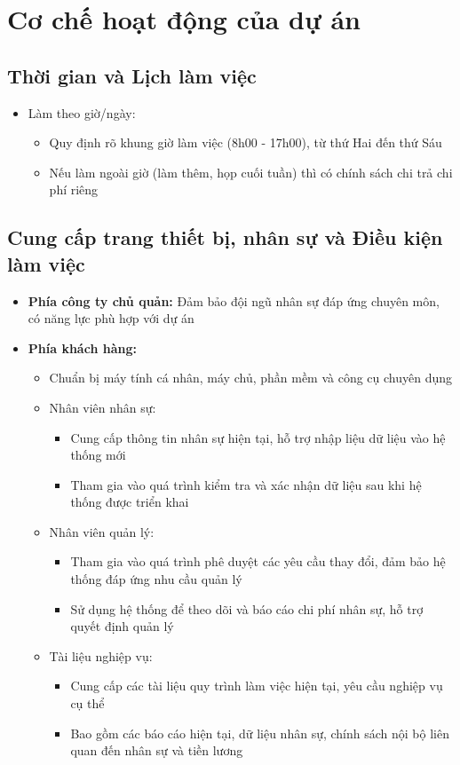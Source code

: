 \section{Cơ chế hoạt động của dự án}
\subsection{Thời gian và Lịch làm việc}
\begin{itemize}
    \item Làm theo giờ/ngày:
    \begin{itemize}
    \item Quy định rõ khung giờ làm việc (8h00 - 17h00), từ thứ Hai đến thứ Sáu
    \item Nếu làm ngoài giờ (làm thêm, họp cuối tuần) thì có chính sách chi trả chi phí riêng
\end{itemize}
\end{itemize}
\subsection{Cung cấp trang thiết bị, nhân sự và Điều kiện làm việc}
\begin{itemize}
    \item \textbf{Phía công ty chủ quản:} Đảm bảo đội ngũ nhân sự đáp ứng chuyên môn, có năng lực phù hợp với dự án
    \item \textbf{Phía khách hàng:}
    \begin{itemize}
    \item Chuẩn bị máy tính cá nhân, máy chủ, phần mềm và công cụ chuyên dụng
    \item Nhân viên nhân sự:
    \begin{itemize}
        \item Cung cấp thông tin nhân sự hiện tại, hỗ trợ nhập liệu dữ liệu vào hệ thống mới
        \item Tham gia vào quá trình kiểm tra và xác nhận dữ liệu sau khi hệ thống được triển khai
    \end{itemize}
    \item Nhân viên quản lý:
    \begin{itemize}
        \item Tham gia vào quá trình phê duyệt các yêu cầu thay đổi, đảm bảo hệ thống đáp ứng nhu cầu quản lý
        \item Sử dụng hệ thống để theo dõi và báo cáo chi phí nhân sự, hỗ trợ quyết định quản lý
    \end{itemize}
    \item Tài liệu nghiệp vụ:
    \begin{itemize}
        \item Cung cấp các tài liệu quy trình làm việc hiện tại, yêu cầu nghiệp vụ cụ thể
        \item Bao gồm các báo cáo hiện tại, dữ liệu nhân sự, chính sách nội bộ liên quan đến nhân sự và tiền lương
    \end{itemize}
\end{itemize}
\end{itemize}
